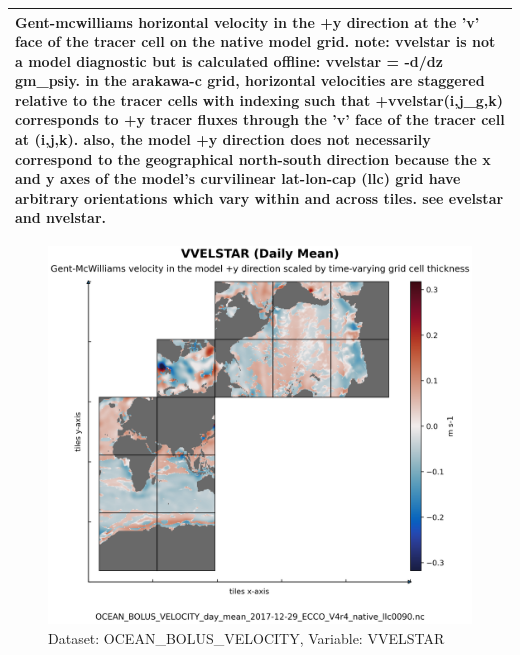 \begin{longtable}{|m{}|m{}|m{}|m{}|}
\multicolumn{4}{|p{1\textwidth}|}{Gent-mcwilliams horizontal velocity in the +y direction at the 'v' face of the tracer cell on the native model grid. note: vvelstar is not a model diagnostic but is calculated offline: vvelstar = -d/dz gm\_psiy. in the arakawa-c grid, horizontal velocities are staggered relative to the tracer cells with indexing such that +vvelstar(i,j\_g,k) corresponds to +y tracer fluxes through the 'v' face of the tracer cell at (i,j,k). also, the model +y direction does not necessarily correspond to the geographical north-south direction because the x and y axes of the model's curvilinear lat-lon-cap (llc) grid have arbitrary orientations which vary within and across tiles. see evelstar and nvelstar.} \\ \hline
\end{longtable}

\begin{figure}[H]
\centering
\includegraphics[scale=0.55]{../images/plots/native_plots/Gent-McWilliams_Ocean_Bolus_Velocity/VVELSTAR.png}
\caption{Dataset: OCEAN\_BOLUS\_VELOCITY, Variable: VVELSTAR}
\label{tab:table-OCEAN_BOLUS_VELOCITY_VVELSTAR-Plot}
\end{figure}
\pagebreak

